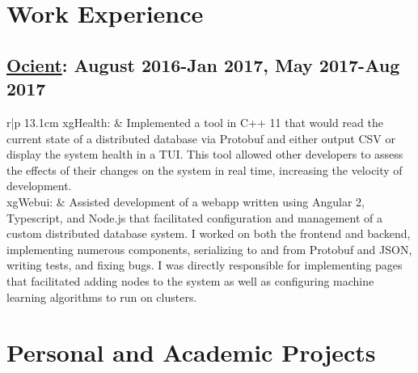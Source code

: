 \documentclass[a4paper,10pt]{article} %
\begin{document}




\section{Work Experience}
\subsection{\href{http://www.ocient.com/}{Ocient}: August 2016-Jan 2017, May 2017-Aug 2017}
\begin{tabular}{r|p {13.1cm}}
    xgHealth: & Implemented a tool in C++ 11 that would read the current state of a distributed database via Protobuf and either output CSV or display the system health in a TUI. This tool allowed other developers to assess the effects of their changes on the system in real time, increasing the velocity of development.\\ 
    xgWebui: & Assisted development of a webapp written using Angular 2, Typescript, and Node.js that facilitated configuration and management of a custom distributed database system. I worked on both the frontend and backend, implementing numerous components, serializing to and from Protobuf and JSON, writing tests, and fixing bugs.
    I was directly responsible for implementing pages that facilitated adding nodes to the system as well as configuring machine learning algorithms to run on clusters.
\end{tabular}


\section{Personal and Academic Projects}
\end{document}
